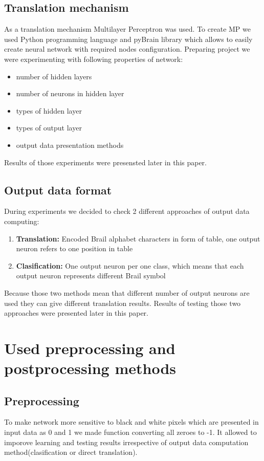 \documentclass[a4paper]{article}
\begin{document}
\subsection{Translation mechanism}
As a translation mechanism Multilayer Perceptron was used. To create MP we used Python programming language and pyBrain library which allows to easily create neural network with required nodes configuration. Preparing project we were experimenting with following properties of network:
\begin{itemize}
	\item number of hidden layers
	\item number of neurons in hidden layer
	\item types of hidden layer
	\item types of output layer
	\item output data presentation methods
\end{itemize}
Results of those experiments were presensted later in this paper.

\subsection{Output data format}
During experiments we decided to check 2 different approaches of output data computing:
\begin{enumerate}
	\item \textbf{Translation:} Encoded Brail alphabet characters in form of table, one output neuron refers to one position in table 
	\item \textbf{Clasification:} One output neuron per one class, which means that each output neuron represents different Brail symbol
\end{enumerate}
Because those two methods mean that different number of output neurons are used they can give different translation results.
Results of testing those two approaches were presented later in this paper.

\section{Used preprocessing and postprocessing methods}
\subsection{Preprocessing} 
To make network more sensitive to black and white pixels which are presented in input data as 0 and 1 we made function converting all zeroes to -1.
It allowed to imporove learning and testing results irrespective of output data computation method(clasification or direct translation).
\end{document}
